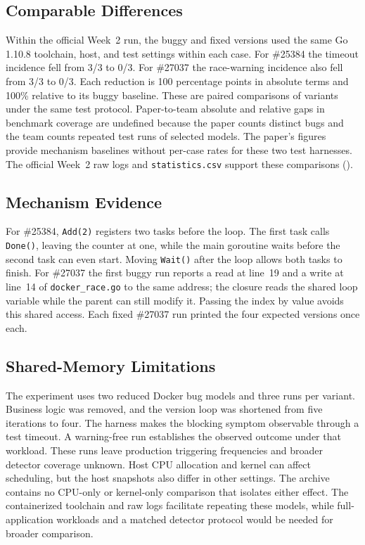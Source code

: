 \subsection{Comparable Differences}
Within the official Week~2 run, the buggy and fixed versions used the
same Go 1.10.8 toolchain, host, and test settings within each case.
For \#25384 the timeout incidence fell from 3/3 to 0/3. For \#27037 the
race-warning incidence also fell from 3/3 to 0/3. Each reduction is
100 percentage points in absolute terms and 100\% relative to its buggy
baseline. These are paired comparisons of variants under the same test
protocol. Paper-to-team absolute and relative gaps in benchmark coverage
are undefined because the paper counts distinct bugs and the team counts
repeated test runs of selected models. The paper's figures provide
mechanism baselines without per-case rates for these two test harnesses.
The official Week~2 raw logs and \texttt{statistics.csv} support these
comparisons ().

\subsection{Mechanism Evidence}
For \#25384, \texttt{Add(2)} registers two tasks before the loop. The
first task calls \texttt{Done()}, leaving the counter at one, while the
main goroutine waits before the second task can even start. Moving
\texttt{Wait()} after the loop allows both tasks to finish. For
\#27037 the first buggy run reports a read at line~19 and a write at
line~14 of \texttt{docker\_race.go} to the same address; the closure
reads the shared loop variable while the parent can still modify it.
Passing the index by value avoids this shared access. Each fixed
\#27037 run printed the four expected versions once each.

\subsection{Shared-Memory Limitations}
The experiment uses two reduced Docker bug models and three runs per
variant. Business logic was removed, and the version loop was shortened
from five iterations to four. The harness makes the blocking symptom
observable through a test timeout. A warning-free run establishes the
observed outcome under that workload. These runs leave production
triggering frequencies and broader detector coverage unknown. Host
CPU allocation and kernel can affect scheduling, but the host snapshots
also differ in other settings. The archive contains no CPU-only or
kernel-only comparison that isolates either effect. The containerized
toolchain and raw logs facilitate repeating these models, while
full-application workloads and a matched detector protocol would be
needed for broader comparison.

